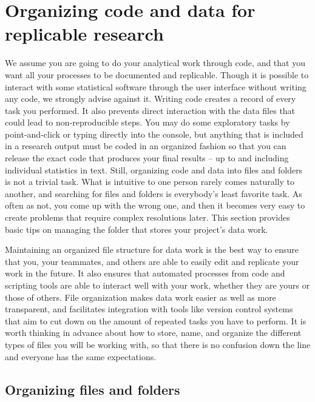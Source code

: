 \documentclass[
]{book}
\begin{document}
\hypertarget{organizing-code-and-data-for-replicable-research}{%
\section*{Organizing code and data for replicable research}\label{organizing-code-and-data-for-replicable-research}}

We assume you are going to do your analytical work through code,
and that you want all your processes to be documented and replicable.
Though it is possible to interact with some statistical software
through the user interface without writing any code,
we strongly advise against it.
Writing code creates a record of every task you performed.
It also prevents direct interaction with the data files that could lead to non-reproducible steps.
You may do some exploratory tasks by point-and-click or typing directly into the console,
but anything that is included in a research output
must be coded in an organized fashion so that you can release
the exact code that produces your final results --
up to and including individual statistics in text.
Still, organizing code and data into files and folders is not a trivial task.
What is intuitive to one person rarely comes naturally to another,
and searching for files and folders is everybody's least favorite task.
As often as not, you come up with the wrong one,
and then it becomes very easy to create problems that require complex resolutions later.
This section provides basic tips on managing the folder
that stores your project's data work.

Maintaining an organized file structure for data work is the best way
to ensure that you, your teammates, and others
are able to easily edit and replicate your work in the future.
It also ensures that automated processes from code and scripting tools
are able to interact well with your work,
whether they are yours or those of others.
File organization makes data work easier as well as more transparent,
and facilitates integration with tools like version control systems
that aim to cut down on the amount of repeated tasks you have to perform.
It is worth thinking in advance about how to store, name, and organize
the different types of files you will be working with,
so that there is no confusion down the line
and everyone has the same expectations.

\hypertarget{organizing-files-and-folders}{%
\subsection*{Organizing files and folders}\label{organizing-files-and-folders}}
\end{document}
